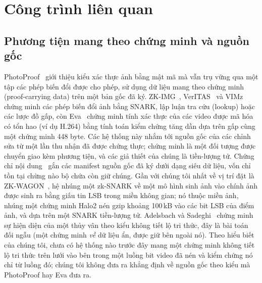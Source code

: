 \documentclass[journal]{IEEEtran}
\begin{document}
\section{Công trình liên quan}
\label{sec:related}

\subsection{Phương tiện mang theo chứng minh và nguồn gốc}
PhotoProof~\cite{ref:photoproof} giới thiệu kiểu xác thực ảnh bằng mật mã mà
vẫn trụ vững qua một tập các phép biến đổi được cho phép, sử dụng dữ liệu mang
theo chứng minh (proof-carrying data) trên một bản gốc đã ký.
ZK-IMG~\cite{ref:zkimg}, VerITAS~\cite{ref:veritas} và VIMz~\cite{ref:vimz}
chứng minh các phép biến đổi ảnh bằng SNARK, lập luận tra cứu (lookup) hoặc các
lược đồ gấp, còn Eva~\cite{ref:eva} chứng minh tính xác thực của các video được
mã hóa có tổn hao (ví dụ H.264) bằng tính toán kiểm chứng tăng dần dựa trên gấp
cùng một chứng minh 448 byte. Các hệ thống này nhắm tới nguồn gốc của các chỉnh
sửa từ một lần thu nhận đã được chứng thực; chứng minh là một đối tượng được
chuyển giao kèm phương tiện, và các giả thiết của chúng là tiền-lượng tử. Chứng
chỉ nội dung~\cite{ref:c2pa} gắn các manifest nguồn gốc đã ký dưới dạng siêu dữ
liệu, vốn chỉ tồn tại chừng nào bộ chứa còn giữ chúng. Gần với chúng tôi nhất về
vị trí đặt là ZK-WAGON~\cite{ref:zkwagon}, hệ nhúng một zk-SNARK về một mô hình
sinh ảnh vào chính ảnh được sinh ra bằng giấu tin LSB trong miền không gian; nó
thuộc miền ảnh, nhúng một chứng minh Halo2 nén gzip khoảng 100\,kB vào các bit
LSB của điểm ảnh, và dựa trên một SNARK tiền-lượng tử.
Adelsbach và Sadeghi~\cite{ref:adelsbach} chứng minh sự hiện diện của một thủy
vân theo kiểu không tiết lộ tri thức, đây là bài toán đối ngẫu (một chứng minh
\emph{về} dữ liệu ẩn, được giữ bên ngoài nó). Theo hiểu biết của chúng tôi,
chưa có hệ thống nào trước đây mang một chứng minh không tiết lộ tri thức trên
lưới vào bên trong một luồng bit video đã nén và kiểm chứng nó chỉ từ luồng đó;
chúng tôi không đưa ra khẳng định về nguồn gốc theo kiểu mà PhotoProof hay Eva
đưa ra.
\end{document}
